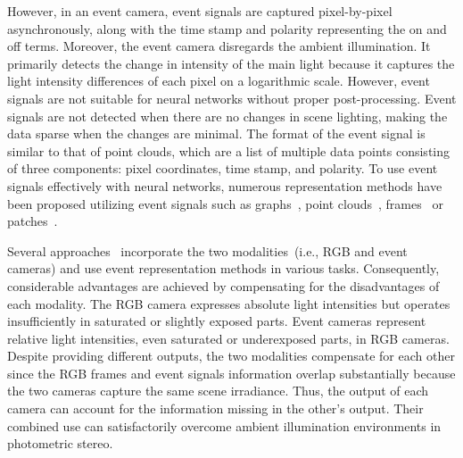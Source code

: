 However, in an event camera, event signals are captured pixel-by-pixel asynchronously, along with the time stamp and polarity representing the on and off terms.
Moreover, the event camera disregards the ambient illumination. It primarily detects the change in intensity of the main light because it captures the light intensity differences of each pixel on a logarithmic scale. However, event signals are not suitable for neural networks without proper post-processing. Event signals are not detected when there are no changes in scene lighting, making the data sparse when the changes are minimal.
The format of the event signal is similar to that of point clouds, which are a list of multiple data points consisting of three components: pixel coordinates, time stamp, and polarity.
To use event signals effectively with neural networks, numerous representation methods have been proposed utilizing event signals such as graphs~\citep{bi2019graph,bi2020graph}, point clouds~\citep{sekikawa2019eventnet,vemprala2021representation}, frames~\citep{rebecq2017real,innocenti2021temporal,gehrig2019end} or patches~\citep{sabater2022event}. 

Several approaches~\citep{messikommer2022multi,gehrig2021combining,messikommer2022bridging} incorporate the two modalities~(i.e., RGB and event cameras) and use event representation methods in various tasks. Consequently, considerable advantages are achieved by compensating for the disadvantages of each modality. The RGB camera expresses absolute light intensities but operates insufficiently in saturated or slightly exposed parts. Event cameras represent relative light intensities, even saturated or underexposed parts, in RGB cameras. Despite providing different outputs, the two modalities compensate for each other since the RGB frames and event signals information overlap substantially because the two cameras capture the same scene irradiance. Thus, the output of each camera can account for the information missing in the other's output. Their combined use can satisfactorily overcome ambient illumination environments in photometric stereo.